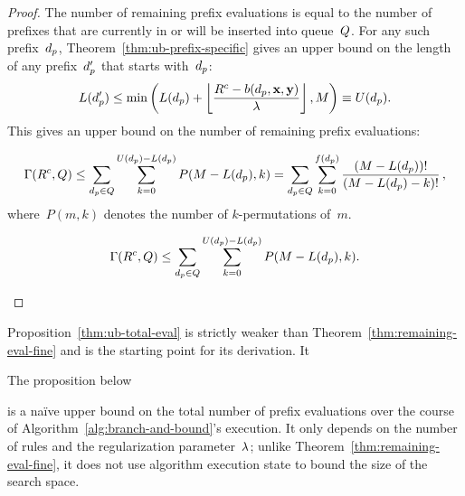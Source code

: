 \begin{proof}
The number of remaining prefix evaluations is equal to the number of
prefixes that are currently in or will be inserted into queue~$Q$.
%
For any such prefix~$d_p$, Theorem~\ref{thm:ub-prefix-specific}
gives an upper bound on the length of any prefix~$d_p'$
that starts with~$d_p$:
\begin{align}
L(d_p') \le \min \left( L(d_p) + \left\lfloor \frac{{R^c} - b(d_p, \mathbf{x}, \mathbf{y})}{{\lambda}} \right\rfloor, M \right)
\equiv U(d_p).
\end{align}
This gives an upper bound on the number of remaining prefix evaluations:
\begin{arxiv}
\begin{align}
\Gamma({R^c}, Q)
\le \sum_{d_p \in Q} \sum_{k=0}^{U(d_p) - L(d_p)} P(M - L(d_p), k)
= \sum_{d_p \in Q} \sum_{k=0}^{f(d_p)} \frac{(M - L(d_p))!}{(M - L(d_p) - k)!}\,,
\end{align}
where~$P(m, k)$ denotes the number of $k$-permutations of~$m$.
\end{arxiv}
\begin{kdd}
\begin{align}
\Gamma({R^c}, Q)
\le \sum_{d_p \in Q} \sum_{k=0}^{U(d_p) - L(d_p)} P(M - L(d_p), k).
\end{align}
\end{kdd}
\end{proof}

\begin{arxiv}
Proposition~\ref{thm:ub-total-eval} is strictly weaker than
Theorem~\ref{thm:remaining-eval-fine} and is the starting point for its derivation.
It
\end{arxiv}
\begin{kdd}
The proposition below
\end{kdd}
is a na\"ive upper bound on
the total number of prefix evaluations over the course of
Algorithm~\ref{alg:branch-and-bound}'s execution.
%
It only depends on the number of rules and
the regularization parameter~${\lambda}$;
\ie unlike Theorem~\ref{thm:remaining-eval-fine},
it does not use algorithm execution state to
bound the size of the search space.

